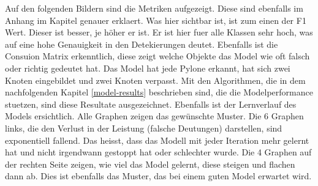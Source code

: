Auf den folgenden Bildern sind die Metriken aufgezeigt. Diese sind ebenfalls im Anhang im Kapitel  genauer erklaert. Was hier sichtbar ist, ist zum einen der F1 Wert. Dieser ist besser, je höher er ist. Er ist hier fuer alle Klassen sehr hoch, was auf eine hohe Genauigkeit in den Detekierungen deutet. Ebenfalls ist die Consuion Matrix erkenntlich, diese zeigt welche Objekte das Model wie oft falsch oder richtig gedeutet hat. Das Model hat jede Pylone erkannt, hat sich zwei Knoten eingebildet und zwei Knoten verpasst. Mit den Algorithmen, die in dem nachfolgenden Kapitel \ref{model-results} beschrieben sind, die die Modelperformance stuetzen, sind diese Resultate ausgezeichnet. Ebenfalls ist der Lernverlauf des Models ersichtlich. Alle Graphen zeigen das gewünschte Muster. Die 6 Graphen links, die den Verlust in der Leistung (falsche Deutungen) darstellen, sind exponentiell fallend. Das heisst, dass das Modell mit jeder Iteration mehr gelernt hat und nicht irgendwann gestoppt hat oder schlechter wurde. Die 4 Graphen auf der rechten Seite zeigen, wie viel das Model gelernt, diese steigen und flachen dann ab. Dies ist ebenfalls das Muster, das bei einem guten Model erwartet wird.\cite{model-performance}

